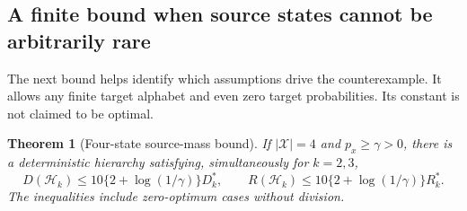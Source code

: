 \documentclass[11pt]{article}
\newtheorem{theorem}{Theorem}[section]
\theoremstyle{remark}\newtheorem{remark}[theorem]{Remark}
\newcommand{\cH}{\mathcal H}
\begin{document}
\subsection{A finite bound when source states cannot be arbitrarily rare}
The next bound helps identify which assumptions drive the counterexample.
It allows any finite target alphabet and even zero target probabilities.
Its constant is not claimed to be optimal.

\begin{theorem}[Four-state source-mass bound]
\label{thm:mass-bound}
If $|\mathcal X|=4$ and $p_x\ge\gamma>0$, there is a deterministic
hierarchy satisfying, simultaneously for $k=2,3$,
\begin{equation}
 D(\cH_k)\le10\{2+\log(1/\gamma)\}D_k^*,\qquad
 R(\cH_k)\le10\{2+\log(1/\gamma)\}R_k^*.
 \label{eq:mass-bound}
\end{equation}
The inequalities include zero-optimum cases without division.
\end{theorem}
\end{document}
